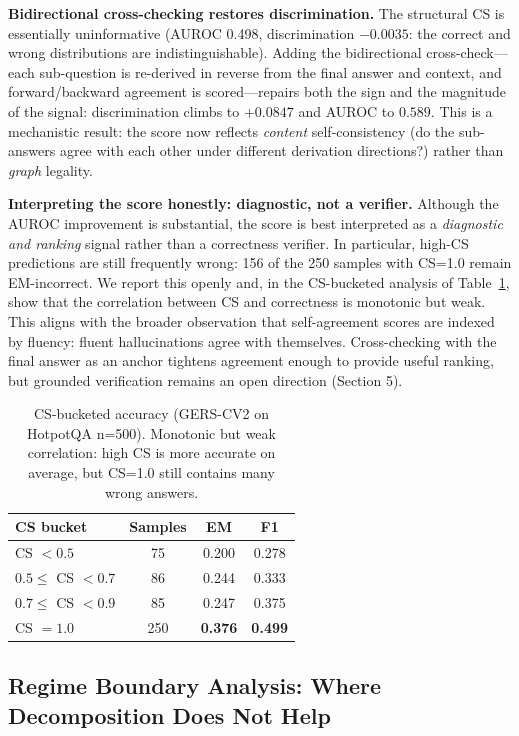 \documentclass[11pt,a4paper]{article}
\begin{document}
\textbf{Bidirectional cross-checking restores discrimination.} The structural CS is essentially uninformative (AUROC 0.498, discrimination $-0.0035$: the correct and wrong distributions are indistinguishable). Adding the bidirectional cross-check---each sub-question is re-derived in reverse from the final answer and context, and forward/backward agreement is scored---repairs both the sign and the magnitude of the signal: discrimination climbs to $+0.0847$ and AUROC to $0.589$. This is a mechanistic result: the score now reflects \emph{content} self-consistency (do the sub-answers agree with each other under different derivation directions?) rather than \emph{graph} legality.

\textbf{Interpreting the score honestly: diagnostic, not a verifier.} Although the AUROC improvement is substantial, the score is best interpreted as a \emph{diagnostic and ranking} signal rather than a correctness verifier. In particular, high-CS predictions are still frequently wrong: 156 of the 250 samples with CS=1.0 remain EM-incorrect. We report this openly and, in the CS-bucketed analysis of Table~\ref{tab:cs_buckets}, show that the correlation between CS and correctness is monotonic but weak. This aligns with the broader observation that self-agreement scores are indexed by fluency: fluent hallucinations agree with themselves. Cross-checking with the final answer as an anchor tightens agreement enough to provide useful ranking, but grounded verification remains an open direction (Section 5).

\begin{table}[h]
\centering
\caption{CS-bucketed accuracy (GERS-CV2 on HotpotQA n=500). Monotonic but weak correlation: high CS is more accurate on average, but CS=1.0 still contains many wrong answers.}
\label{tab:cs_buckets}
\begin{tabular}{lccc}
\toprule
CS bucket & Samples & EM & F1 \\
\midrule
CS $<0.5$ & 75 & 0.200 & 0.278 \\
$0.5\le$ CS $<0.7$ & 86 & 0.244 & 0.333 \\
$0.7\le$ CS $<0.9$ & 85 & 0.247 & 0.375 \\
CS $=1.0$ & 250 & \textbf{0.376} & \textbf{0.499} \\
\bottomrule
\end{tabular}
\end{table}

\subsection{Regime Boundary Analysis: Where Decomposition Does Not Help}
\end{document}
